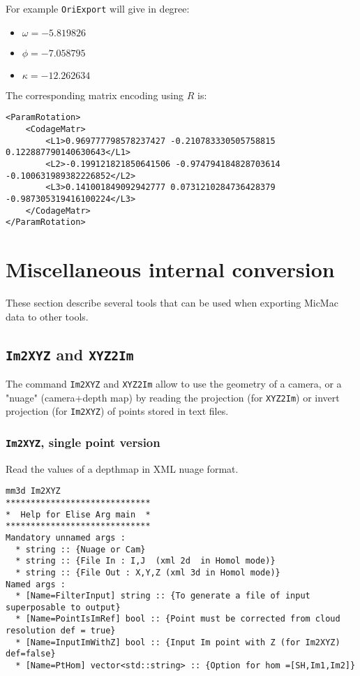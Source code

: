 For example {\tt OriExport} will give in degree:
\newline


\begin{itemize}
\item $\omega=-5.819826$  
\item $\phi=-7.058795$  
\item $\kappa=-12.262634$\newline
\end{itemize}



The corresponding matrix encoding using $R$ is:


\begin{verbatim}
<ParamRotation>
    <CodageMatr>
        <L1>0.969777798578237427 -0.210783330505758815 0.122887790140630643</L1>
        <L2>-0.199121821850641506 -0.974794184828703614 -0.100631989382226852</L2>
        <L3>0.141001849092942777 0.0731210284736428379 -0.987305319416100224</L3>
	</CodageMatr>
</ParamRotation>
\end{verbatim}


\section{Miscellaneous internal conversion}

These section describe several tools that can be used when exporting MicMac data to
other tools.

\subsection{{\tt Im2XYZ} and {\tt XYZ2Im}}

The command {\tt Im2XYZ} and {\tt XYZ2Im}  allow to use the geometry of a camera, or a
"nuage" (camera+depth map) by reading the projection (for {\tt XYZ2Im}) or invert projection (for  {\tt Im2XYZ})
of points stored in text files.

\subsubsection{{\tt Im2XYZ}, single point version}

Read the values of a depthmap in XML nuage format.

\begin{verbatim}
mm3d Im2XYZ
*****************************
*  Help for Elise Arg main  *
*****************************
Mandatory unnamed args : 
  * string :: {Nuage or Cam}
  * string :: {File In : I,J  (xml 2d  in Homol mode)}
  * string :: {File Out : X,Y,Z (xml 3d in Homol mode)}
Named args : 
  * [Name=FilterInput] string :: {To generate a file of input superposable to output}
  * [Name=PointIsImRef] bool :: {Point must be corrected from cloud resolution def = true}
  * [Name=InputImWithZ] bool :: {Input Im point with Z (for Im2XYZ) def=false}
  * [Name=PtHom] vector<std::string> :: {Option for hom =[SH,Im1,Im2]}
\end{verbatim}

